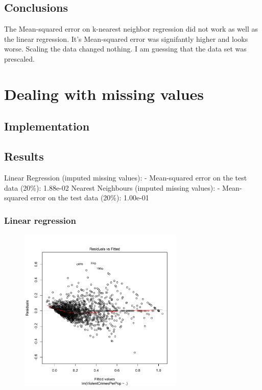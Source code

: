 \documentclass[12pt,a4paper]{article}
\begin{document}
\begin{singlespace}
\subsection{Conclusions}
The Mean-squared error on k-nearest neighbor regression did not work as well as the
 linear regression. It's  Mean-squared error was signifantly higher and looks worse.
 Scaling the data changed nothing. I am guessing that the data set was prescaled.

\section{Dealing with missing values}
\subsection{Implementation}




\subsection{Results}
Linear Regression (imputed missing values):
 - Mean-squared error on the test data (20\%): 1.88e-02
Nearest Neighbours (imputed missing values):
 - Mean-squared error on the test data (20\%): 1.00e-01

\newpage
\subsubsection{Linear regression}
\vspace{-0.5cm}
\begin{figure}[h!]
    \centering
    \includegraphics[width=0.7\textwidth,trim= 0 0 20 30, clip]{Unk_linear_regression_residuals.pdf}
\end{figure}
\FloatBarrier


\end{singlespace}
\end{document}
